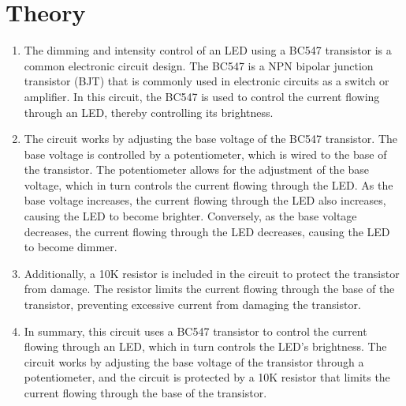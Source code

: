 \documentclass[12pt]{article}
\begin{document}
\section{Theory}
    \begin{enumerate}
        \item The dimming and intensity control of an LED using a BC547 transistor is a  common electronic circuit design. The BC547 is a NPN bipolar junction  transistor (BJT) that is commonly used in electronic circuits as a switch or  amplifier. In this circuit, the BC547 is used to control the current flowing  through an LED, thereby controlling its brightness. 
        \item The circuit works by adjusting the base voltage of the BC547 transistor.  The base voltage is controlled by a potentiometer, which is wired to the  
        base of the transistor. The potentiometer allows for the adjustment of the  base voltage, which in turn controls the current flowing through the LED.  As the base voltage increases, the current flowing through the LED also  increases, causing the LED to become brighter. Conversely, as the base  voltage decreases, the current flowing through the LED decreases, causing  the LED to become dimmer. 
        \item Additionally, a 10K resistor is included in the circuit to protect the transistor  from damage. The resistor limits the current flowing through the base of  the transistor, preventing excessive current from damaging the transistor.
        \item In summary, this circuit uses a BC547 transistor to control the current  flowing through an LED, which in turn controls the LED's brightness. The  circuit works by adjusting the base voltage of the transistor through a  potentiometer, and the circuit is protected by a 10K resistor that limits the  current flowing through the base of the transistor.
    \end{enumerate}
\end{document}
